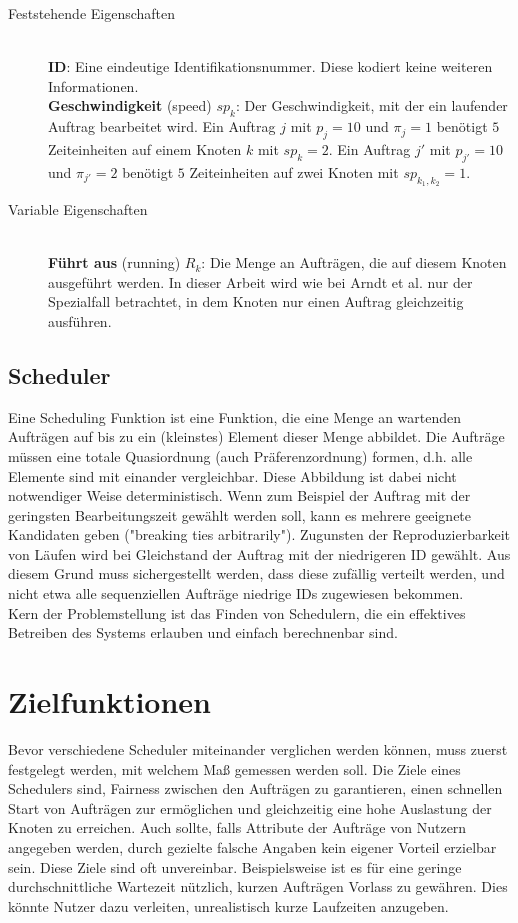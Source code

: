 \begin{description}
	\item[Feststehende Eigenschaften] \hfil \\
	\textbf{ID}: Eine eindeutige Identifikationsnummer. Diese kodiert keine weiteren Informationen.\\
	\textbf{Geschwindigkeit} (speed) $sp_k$: Der Geschwindigkeit, mit der ein laufender Auftrag bearbeitet wird. Ein Auftrag $j$ mit $p_j = 10$ und $\pi_j = 1$ benötigt $5$ Zeiteinheiten auf einem Knoten $k$ mit $sp_k = 2$. Ein Auftrag $j'$ mit $p_{j'} = 10$ und $\pi_{j'} = 2$ benötigt $5$ Zeiteinheiten auf zwei Knoten mit $sp_{k_1, k_2} = 1$.\\
	\item[Variable Eigenschaften] \hfil \\
	\textbf{Führt aus} (running) $R_k$: Die Menge an Aufträgen, die auf diesem Knoten ausgeführt werden. In dieser Arbeit wird wie bei Arndt et al. \cite{Arn99} nur der Spezialfall betrachtet, in dem Knoten nur einen Auftrag gleichzeitig ausführen.\\
\end{description}


\subsection{Scheduler}
Eine Scheduling Funktion ist eine Funktion, die eine Menge an wartenden Aufträgen auf bis zu ein (kleinstes) Element dieser Menge abbildet. Die Aufträge müssen eine totale Quasiordnung (auch  Präferenzordnung) formen, d.h. alle Elemente sind mit einander vergleichbar.
Diese Abbildung ist dabei nicht notwendiger Weise deterministisch. Wenn zum Beispiel der Auftrag mit der geringsten Bearbeitungszeit gewählt werden soll, kann es mehrere geeignete Kandidaten geben ("breaking ties arbitrarily")\cite{Kar97}. Zugunsten der Reproduzierbarkeit von Läufen wird bei Gleichstand der Auftrag mit der niedrigeren ID gewählt. Aus diesem Grund muss sichergestellt werden, dass diese zufällig verteilt werden, und nicht etwa alle sequenziellen Aufträge niedrige IDs zugewiesen bekommen.\\
Kern der Problemstellung ist das Finden von Schedulern, die ein effektives Betreiben des Systems erlauben und einfach berechnenbar sind.

\section{Zielfunktionen}
Bevor verschiedene Scheduler miteinander verglichen werden können, muss zuerst festgelegt werden, mit welchem Maß gemessen werden soll. Die Ziele eines Schedulers sind, Fairness zwischen den Aufträgen zu garantieren, einen schnellen Start von Aufträgen zur ermöglichen und gleichzeitig eine hohe Auslastung der Knoten zu erreichen. Auch sollte, falls Attribute der Aufträge von Nutzern angegeben werden, durch gezielte falsche Angaben kein eigener Vorteil erzielbar sein. Diese Ziele sind oft unvereinbar. Beispielsweise ist es für eine geringe durchschnittliche Wartezeit nützlich, kurzen Aufträgen Vorlass zu gewähren. Dies könnte Nutzer dazu verleiten, unrealistisch kurze Laufzeiten anzugeben.

